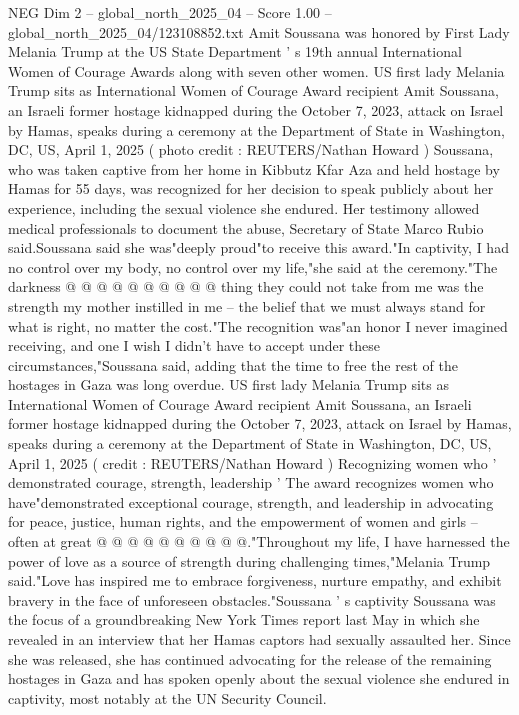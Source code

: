 \begin{textsample}{NEG Dim 2 – global\_north\_2025\_04 – Score 1.00 – global\_north\_2025\_04/123108852.txt}  \label{ex:f2_neg_022}
Amit Soussana was honored by First Lady Melania Trump at the US State Department ' s 19th annual International Women of Courage Awards along with seven other women.
US first lady Melania Trump sits as International Women of Courage Award recipient Amit Soussana, an Israeli former hostage kidnapped during the October 7, 2023, attack on Israel by Hamas, speaks during a ceremony at the Department of State in Washington, DC, US, April 1, 2025 ( photo credit : REUTERS/Nathan Howard ) Soussana, who was taken captive from her home in Kibbutz Kfar Aza and held hostage by Hamas for 55 days, was recognized for her decision to speak publicly about her experience, including the sexual violence she endured.
Her testimony allowed medical professionals to document the abuse, Secretary of State Marco Rubio said.Soussana said she was"deeply proud"to receive this award."In captivity, I had no control over my body, no control over my life,"she said at the ceremony."The darkness @ @ @ @ @ @ @ @ @ @ thing they could not take from me was the strength my mother instilled in me -- the belief that we must always stand for what is right, no matter the cost."The recognition was"an honor I never imagined receiving, and one I wish I didn't have to accept under these circumstances,"Soussana said, adding that the time to free the rest of the hostages in Gaza was long overdue.
US first lady Melania Trump sits as International Women of Courage Award recipient Amit Soussana, an Israeli former hostage kidnapped during the October 7, 2023, attack on Israel by Hamas, speaks during a ceremony at the Department of State in Washington, DC, US, April 1, 2025 ( credit : REUTERS/Nathan Howard ) Recognizing women who ' demonstrated courage, strength, leadership ' The award recognizes women who have"demonstrated exceptional courage, strength, and leadership in advocating for peace, justice, human rights, and the empowerment of women and girls -- often at great @ @ @ @ @ @ @ @ @ @."Throughout my life, I have harnessed the power of love as a source of strength during challenging times,"Melania Trump said."Love has inspired me to embrace forgiveness, nurture empathy, and exhibit bravery in the face of unforeseen obstacles."Soussana ' s captivity Soussana was the focus of a groundbreaking New York Times report last May in which she revealed in an interview that her Hamas captors had sexually assaulted her.
Since she was released, she has continued advocating for the release of the remaining hostages in Gaza and has spoken openly about the sexual violence she endured in captivity, most notably at the UN Security Council.

\end{textsample}
